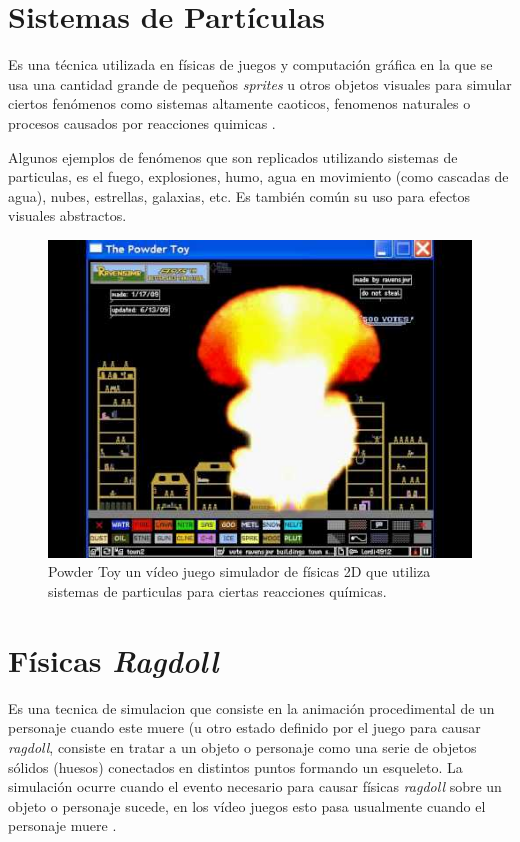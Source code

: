 \section{Sistemas de Partículas}
Es una técnica utilizada en físicas de juegos y computación gráfica en la que se usa una cantidad grande de pequeños \emph{sprites} u otros objetos visuales para simular ciertos fenómenos como sistemas altamente caoticos, fenomenos naturales o procesos causados por reacciones quimicas \cite{vanderburg_particlesystem}. 

Algunos ejemplos de fenómenos que son replicados utilizando sistemas de particulas, es el fuego, explosiones, humo, agua en movimiento (como cascadas de agua), nubes, estrellas, galaxias, etc. Es también común su uso para efectos visuales abstractos.
\begin{figure}[H]
\centering
\includegraphics[width=0.9\linewidth]{semana7/powdertoy.jpg} 
\caption{Powder Toy un vídeo juego simulador de físicas 2D que utiliza sistemas de particulas para ciertas reacciones químicas.}
\end{figure}

\section{Físicas \emph{Ragdoll}}
Es una tecnica de simulacion que consiste en la animación procedimental de un personaje cuando este muere (u otro estado definido por el juego para causar \emph{ragdoll}, consiste en tratar a un objeto o personaje como una serie de objetos sólidos (huesos) conectados en distintos puntos formando un esqueleto. La simulación ocurre cuando el evento necesario para causar físicas \emph{ragdoll} sobre un objeto o personaje sucede, en los vídeo juegos esto pasa usualmente cuando el personaje muere \cite{eric_ragdoll}.

